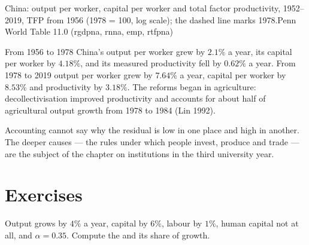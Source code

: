 \begin{omchart}{China: output per worker, capital per worker and total
factor productivity, 1952--2019, TFP from 1956 (1978 = 100, log scale); the dashed line marks
1978.}{Penn World Table 11.0 (rgdpna, rnna, emp, rtfpna)}
\end{omchart}

\begin{record}
From 1956 to 1978 China's output per worker grew by $2.1\%$ a year, its
capital per worker by $4.18\%$, and its measured productivity fell by $0.62\%$ a
year. From 1978 to 2019 output per worker grew by $7.64\%$ a year, capital per
worker by $8.53\%$ and productivity by $3.18\%$. %
The reforms began in agriculture: decollectivisation improved productivity
and accounts for about half of agricultural output growth from 1978 to
1984 (Lin 1992). %
\end{record}

Accounting cannot say why the residual is low in one place and high in
another. The deeper causes --- the rules under which people invest,
produce and trade --- are the subject of the chapter on institutions in
the third university year.

\section*{Exercises}\label{sec:b1:growth-accounting:exercises}

\begin{exercise}[$\star$]\label{exo:b1:growth-accounting:residual-ex}
Output grows by $4\%$ a year, capital by $6\%$, labour by $1\%$, human capital
not at all, and $\alpha = 0.35$. Compute the  and its share of growth.
\end{exercise}

